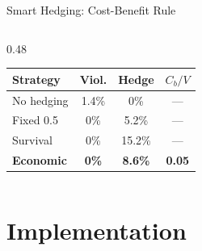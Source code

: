 \documentclass[aspectratio=169,10pt]{beamer}
\begin{document}
\begin{frame}{Smart Hedging: Cost-Benefit Rule}
\begin{columns}[T]
\begin{column}{0.48\textwidth}
\vspace{0.1cm}
\begin{tabular}{lccc}
\toprule
Strategy & Viol. & Hedge & $C_b/V$ \\
\midrule
No hedging & 1.4\% & 0\% & --- \\
Fixed 0.5 & 0\% & 5.2\% & --- \\
Survival & 0\% & 15.2\% & --- \\
\textbf{Economic} & \textbf{0\%} & \textbf{8.6\%} & \textbf{0.05} \\
\bottomrule
\end{tabular}

\end{column}
\end{columns}
\end{frame}

\section{Implementation}
\end{document}
